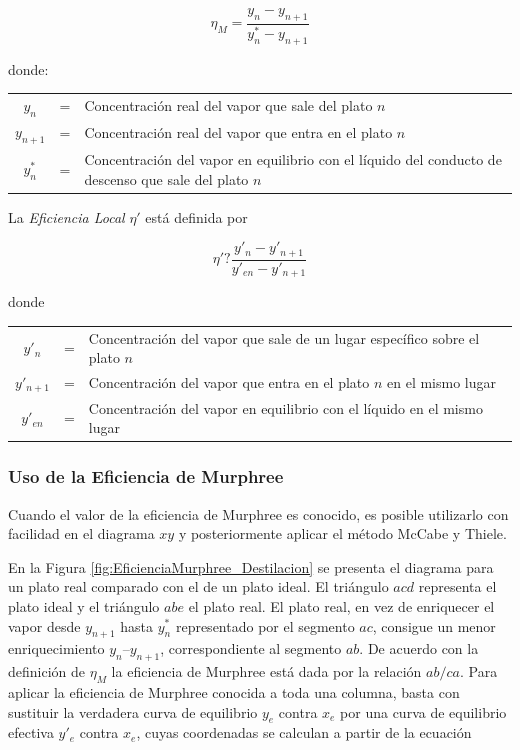 \documentclass[11pt]{book}
\begin{document}
\begin{equation}
    \label{eq:EficienciaMurphree_Destilacion}
    \eta_M = \frac{y_n - y_{n+1}}{y^*_n - y_{n+1}}
\end{equation}

donde:

\hspace{0.2cm}

\begin{tabular}{c c p{13.5cm}}
    $y_n$ & = & Concentración real del vapor que sale del plato $n$ \\
    $y_{n+1}$ & = & Concentración real del vapor que entra en el plato $n$ \\
    $y^*_n$ & = & Concentración del vapor en equilibrio con el líquido del conducto de descenso que sale del plato $n$
\end{tabular}

La \textit{Eficiencia Local} $\eta'$ está definida por

\begin{equation}
    \label{eq:EficienciaLocal_Destilacion}
    \eta' ? \frac{y'_n - y'_{n+1}}{y'_{en}-y'_{n+1}}
\end{equation}

donde

\hspace{0.2cm}

\begin{tabular}{c c p{13.5cm}}
    $y'_n$ & = & Concentración del vapor que sale de un lugar específico sobre el plato $n$ \\
    $y'_{n+1}$ & = & Concentración del vapor que entra en el plato $n$ en el mismo lugar \\
    $y'_{en}$ & = & Concentración del vapor en equilibrio con el líquido en el mismo lugar
\end{tabular}

\subsubsection{Uso de la Eficiencia de Murphree}

Cuando el valor de la eficiencia de Murphree es conocido, es posible utilizarlo con facilidad en el diagrama $xy$ y posteriormente aplicar el método McCabe y Thiele. 

En la Figura \ref{fig:EficienciaMurphree_Destilacion} se presenta el diagrama para un plato real comparado con el de un plato ideal. El triángulo $acd$ representa el plato ideal y el triángulo $abe$ el plato real. El plato real, en vez de enriquecer el vapor desde $y_{n+1}$ hasta $y^*_n$ representado por el segmento $ac$, consigue un menor enriquecimiento $y_n – y_{n+1}$, correspondiente al segmento $ab$. De acuerdo con la definición de $\eta_M$ la eficiencia de Murphree está dada por la relación $ab/ca$. Para aplicar la eficiencia de Murphree conocida a toda una columna, basta con sustituir la verdadera curva de equilibrio $y_e$ contra $x_e$ por una curva de equilibrio efectiva $y'_e$ contra $x_e$, cuyas coordenadas se calculan a partir de la ecuación
\end{document}
